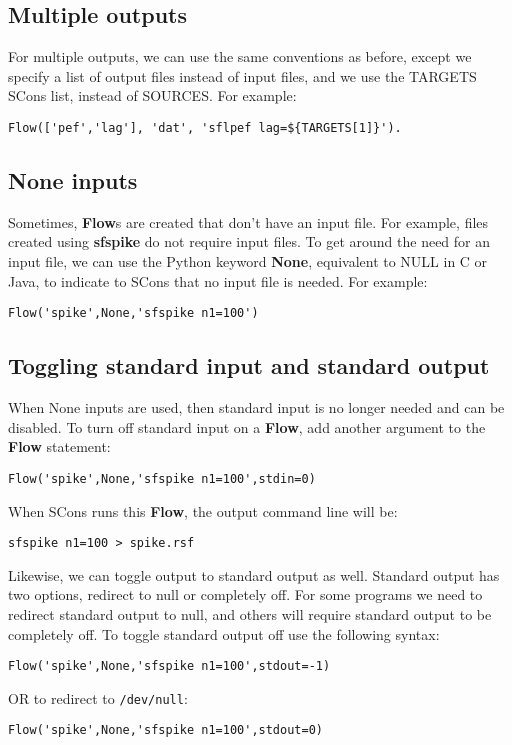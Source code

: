 \subsection{Multiple outputs}

For multiple outputs, we can use the same conventions as before, except we specify a list of output files instead of input files, and we use the TARGETS SCons list, instead of SOURCES.  For example:
\begin{verbatim}
Flow(['pef','lag'], 'dat', 'sflpef lag=${TARGETS[1]}').
\end{verbatim}

\subsection{None inputs}

Sometimes, \textbf{Flow}s are created that don't have an input file.  For example, files created using \textbf{sfspike} do not require input files.  To get around the need for an input file, we can use the Python keyword \textbf{None}, equivalent to NULL in C or Java, to indicate to SCons that no input file is needed.  For example:
\begin{verbatim}
Flow('spike',None,'sfspike n1=100')
\end{verbatim}

\subsection{Toggling standard input and standard output}
When None inputs are used, then standard input is no longer needed and can be disabled. To turn off standard input on a \textbf{Flow}, add another argument to the \textbf{Flow} statement:
\begin{verbatim}
Flow('spike',None,'sfspike n1=100',stdin=0)
\end{verbatim}
When SCons runs this \textbf{Flow}, the output command line will be:
\begin{verbatim}
sfspike n1=100 > spike.rsf
\end{verbatim}
Likewise, we can toggle output to standard output as well.  Standard output has two options, redirect to null or completely off.  For some programs we need to redirect standard output to null, and others will require standard output to be completely off.  To toggle standard output off use the following syntax:
\begin{verbatim}
Flow('spike',None,'sfspike n1=100',stdout=-1)
\end{verbatim}
OR to redirect to \texttt{/dev/null}:
\begin{verbatim}
Flow('spike',None,'sfspike n1=100',stdout=0)
\end{verbatim}

